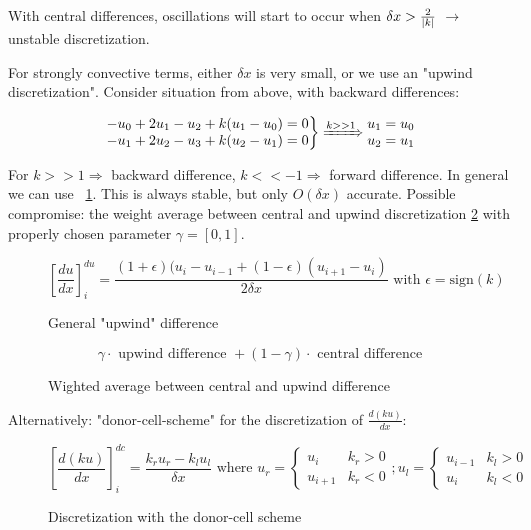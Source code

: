 \documentclass[a4paper,11pt]{scrartcl}
\DeclarePairedDelimiter\abs{\lvert}{\rvert}
\begin{document}
With central differences, oscillations will start to occur when $\delta x > \frac{2}{\abs{k}}$ $\rightarrow$ unstable discretization.

For strongly convective terms, either $\delta x$ is very small, or we use an "upwind discretization". Consider situation from above, with backward differences:

\[\left.\begin{matrix}
	-u_0 + 2u_1 -u_2  + k(u_1 -u_0) =0\\
	-u_1 + 2u_2 - u_3 + k(u_2-u_1) = 0
	\end{matrix}\right\rbrace \xRightarrow{k >> 1}\begin{matrix}
	u_1 = u_0\\
	u_2 = u_1
	\end{matrix} \]

For $k >> 1 \Rightarrow$ backward difference, $k << -1 \Rightarrow$ forward difference.
In general we can use ~\ref{fig:disc-upwind}. This is always stable, but only $O(\delta x)$ accurate. Possible compromise: the weight average between central and upwind discretization \ref{fig:weighted-average} with properly chosen parameter $\gamma = [0,1]$.
\begin{figure}[H]
	\centering
	\[ \left[\frac{d u}{d x}\right]^{du}_i = \frac{ (1+\epsilon) (u_i - u_{i-1} + (1 - \epsilon) (u_{i+1} - u_i)}{ 2 \delta x} \text{ with } \epsilon = \text{sign}(k) \]
	\renewcommand{\thefigure}{3.9}
	\caption{General "upwind" difference}
	\label{fig:disc-upwind}
\end{figure}

\begin{figure}[H]
	\centering
	\[ \gamma \cdot \text{ upwind difference } + (1-\gamma) \cdot \text{ central difference} \]
	\renewcommand{\thefigure}{3.10}
	\caption{Wighted average between central and upwind difference}
	\label{fig:weighted-average}
\end{figure}

Alternatively: "donor-cell-scheme" for the discretization of $\frac{d(ku)}{dx}$:
\begin{figure}[h]
	\centering
	\[ \left[\frac{d(k u)}{d x}\right]^{dc}_i = \frac{ k_r u_r - k_l u_l}{ \delta x} \text{ where } u_r = \begin{cases}
	u_i & k_r > 0\\
	u_{i+1} & k_r < 0
\end{cases} ; u_l = \begin{cases}
u_{i-1} & k_l > 0\\
u_{i} & k_l < 0
\end{cases} \]
	\renewcommand{\thefigure}{3.11}
	\caption{Discretization with the donor-cell scheme}
	\label{fig:dcs-method}
\end{figure}
\end{document}
